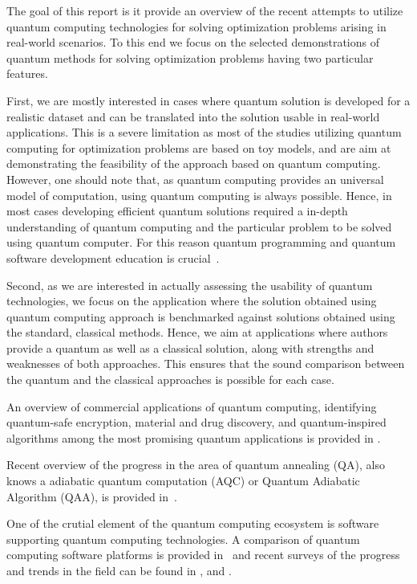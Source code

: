 \documentclass[a4paper,11pt]{article}
\newcommand{\docName}{report\xspace}
\begin{document}
The goal of this \docName is it provide an overview of the recent attempts to utilize quantum computing technologies for solving optimization problems arising in real-world scenarios. To this end we focus on the selected demonstrations of quantum methods for solving optimization problems having two particular features.

First, we are mostly interested in cases where quantum solution is developed for a realistic dataset and can be translated into the solution usable in real-world applications. This is a severe limitation as most of the studies utilizing quantum computing for optimization problems are based on toy models, and are aim at demonstrating the feasibility of the approach based on quantum computing. However, one should note that, as quantum computing provides an universal model of computation, using quantum computing is always possible. Hence, in most cases developing efficient quantum solutions required a in-depth understanding of quantum computing and the particular problem to be solved using quantum computer. For this reason quantum programming and quantum software development education is crucial~\cite{salehi2022computer}.

Second, as we are interested in actually assessing the usability of quantum technologies, we focus on the application where the solution obtained using quantum computing approach is benchmarked against solutions obtained using the standard, classical methods. Hence, we aim at applications where authors provide a quantum as well as a classical solution, along with strengths and weaknesses of both approaches. This ensures that the sound comparison between the quantum and the classical approaches is possible for each case.

An overview of commercial applications of quantum computing, identifying  quantum-safe encryption, material and drug discovery, and quantum-inspired algorithms among the most promising quantum applications is provided in \cite{bova2021commercial}. 

Recent overview of the progress in the area of quantum annealing (QA), also knows a adiabatic quantum computation (AQC) or Quantum Adiabatic Algorithm (QAA), is provided in~\cite{yarkoni2022quantum}.


One of the crutial element of the quantum computing ecosystem is software supporting quantum computing technologies. A comparison of quantum computing software platforms is provided in~\cite{larose2019overview} and recent surveys of the progress and trends in the field can be found in \cite{zhao2020quantum}, \cite{gill2021quantum} and \cite{miszczak2023symbolic}.
\end{document}
